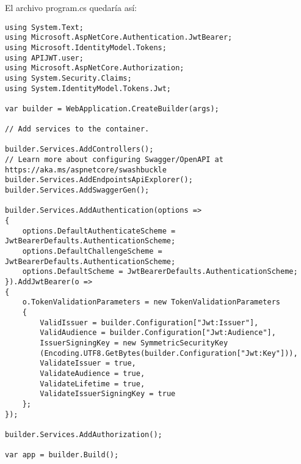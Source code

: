 \documentclass[executivepaper]{article}
\begin{document}
\begin{enumerate}
  El archivo program.cs quedaría así:
 \begin{lstlisting}
using System.Text;
using Microsoft.AspNetCore.Authentication.JwtBearer;
using Microsoft.IdentityModel.Tokens;
using APIJWT.user;
using Microsoft.AspNetCore.Authorization;
using System.Security.Claims;
using System.IdentityModel.Tokens.Jwt;

var builder = WebApplication.CreateBuilder(args);

// Add services to the container.

builder.Services.AddControllers();
// Learn more about configuring Swagger/OpenAPI at https://aka.ms/aspnetcore/swashbuckle
builder.Services.AddEndpointsApiExplorer();
builder.Services.AddSwaggerGen();

builder.Services.AddAuthentication(options =>
{
    options.DefaultAuthenticateScheme = JwtBearerDefaults.AuthenticationScheme;
    options.DefaultChallengeScheme = JwtBearerDefaults.AuthenticationScheme;
    options.DefaultScheme = JwtBearerDefaults.AuthenticationScheme;
}).AddJwtBearer(o =>
{
    o.TokenValidationParameters = new TokenValidationParameters
    {
        ValidIssuer = builder.Configuration["Jwt:Issuer"],
        ValidAudience = builder.Configuration["Jwt:Audience"],
        IssuerSigningKey = new SymmetricSecurityKey
        (Encoding.UTF8.GetBytes(builder.Configuration["Jwt:Key"])),
        ValidateIssuer = true,
        ValidateAudience = true,
        ValidateLifetime = true,
        ValidateIssuerSigningKey = true
    };
});

builder.Services.AddAuthorization();

var app = builder.Build();


\end{lstlisting}
\end{enumerate}
\end{document}
